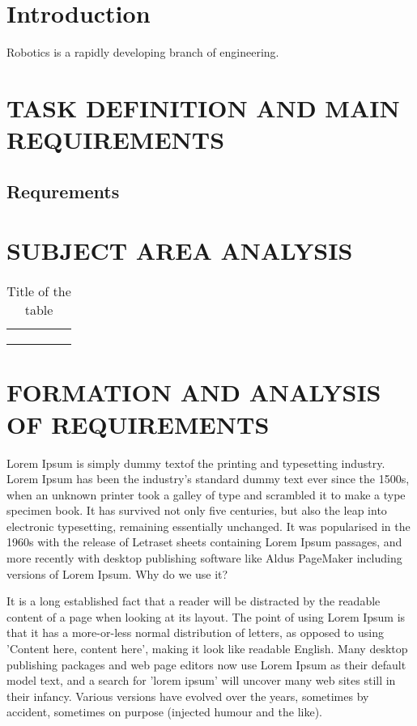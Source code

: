 
\section*{Introduction}
Robotics is a rapidly developing branch of engineering.

\section{TASK DEFINITION AND MAIN REQUIREMENTS}
    \subsection{Requrements}
\section{SUBJECT AREA ANALYSIS}


  \begin{table}[]
    \caption{Title of the table}\label{tab:first}
    \centering
    \begin{tabular}{|l|l|l|l|l|}
    \hline
     &  &  &  &  \\ \hline
     &  &  &  &  \\ \hline
     &  &  &  &  \\ \hline
     &  &  &  &  \\ \hline
    \end{tabular}
    
    \end{table}
\section{FORMATION AND ANALYSIS OF REQUIREMENTS}
Lorem Ipsum is simply dummy textof the printing and typesetting industry. Lorem Ipsum has been the industry's standard dummy text ever since the 1500s, when an unknown printer took a galley of type and scrambled it to make a type specimen book. It has survived not only five centuries, but also the leap into electronic typesetting, remaining essentially unchanged. It was popularised in the 1960s with the release of Letraset sheets containing Lorem Ipsum passages, and more recently with desktop publishing software like Aldus PageMaker including versions of Lorem Ipsum.
Why do we use it?

It is a long established fact that a reader will be distracted by the readable content of a page when looking at its layout. The point of using Lorem Ipsum is that it has a more-or-less normal distribution of letters, as opposed to using 'Content here, content here', making it look like readable English. Many desktop publishing packages and web page editors now use Lorem Ipsum as their default model text, and a search for 'lorem ipsum' will uncover many web sites still in their infancy. Various versions have evolved over the years, sometimes by accident, sometimes on purpose (injected humour and the like).


% 
